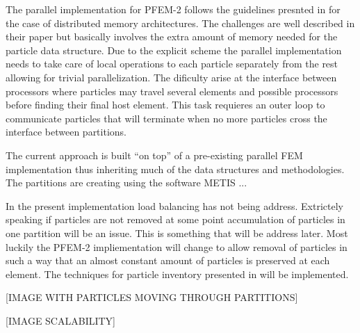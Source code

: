 The parallel implementation for PFEM-2 follows the guidelines presnted in \cite{gimenez:parallel} for the case of distributed memory architectures. The challenges are well described in their paper but basically involves the extra amount of memory needed for the particle data structure. Due to the explicit scheme the parallel implementation needs to take care of local operations to each particle separately from the rest allowing for trivial parallelization. The dificulty arise at the interface between processors where particles may travel several elements and possible processors before finding their final host element. This task requieres an outer loop to communicate particles that will terminate when no more particles cross the interface between partitions.

The current approach is built ``on top'' of a pre-existing parallel FEM implementation thus inheriting much of the data structures and methodologies. The partitions are creating using the software METIS \cite{metis1,metis}...

In the present implementation load balancing has not being address. Extrictely speaking if particles are not removed at some point accumulation of particles in one partition will be an issue. This is something that will be address later. Most luckily the PFEM-2 impliementation will change to allow removal of particles in such a way that an almost constant amount of particles is preserved at each element. The techniques for particle inventory presented in \cite{gimenez-difusion} will be implemented.



[IMAGE WITH PARTICLES MOVING THROUGH PARTITIONS]



[IMAGE SCALABILITY]


 
